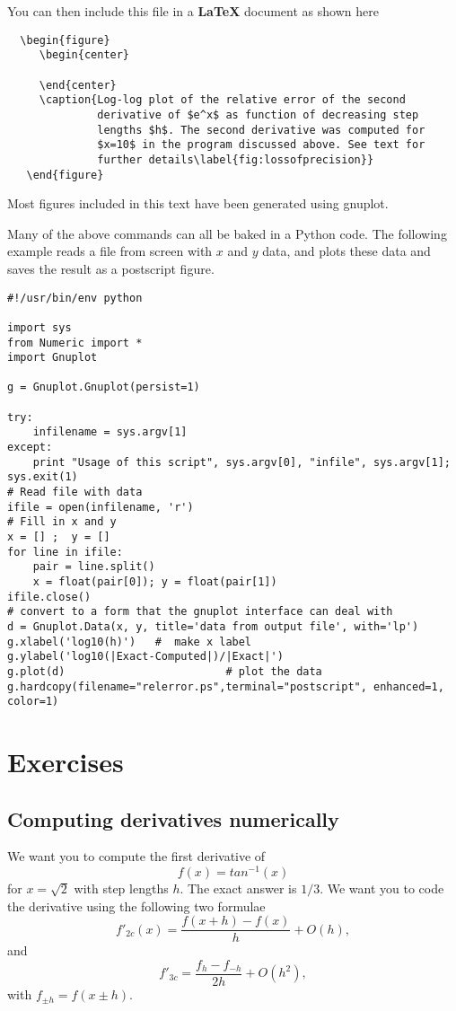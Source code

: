 You can then include this file in a {\bf \LaTeX} document
as shown here
\begin{verbatim}
  \begin{figure}
     \begin{center}
        
     \end{center}
     \caption{Log-log plot of the relative error of the second 
              derivative of $e^x$ as function of decreasing step 
              lengths $h$. The second derivative was computed for 
              $x=10$ in the program discussed above. See text for
              further details\label{fig:lossofprecision}}
   \end{figure}
\end{verbatim}
Most figures included in this text have been generated using gnuplot.
 

Many of the above commands can all be baked in a Python code.  
The following example reads a file from screen with $x$ and $y$ data, and plots these
data and saves the result as a postscript figure.
\lstset{language=python}  
\begin{lstlisting}
#!/usr/bin/env python

import sys
from Numeric import *
import Gnuplot

g = Gnuplot.Gnuplot(persist=1)

try:
    infilename = sys.argv[1]
except:
    print "Usage of this script", sys.argv[0], "infile", sys.argv[1]; sys.exit(1)
# Read file with data
ifile = open(infilename, 'r')
# Fill in x and y
x = [] ;  y = []
for line in ifile:
    pair = line.split()
    x = float(pair[0]); y = float(pair[1])
ifile.close()
# convert to a form that the gnuplot interface can deal with
d = Gnuplot.Data(x, y, title='data from output file', with='lp')
g.xlabel('log10(h)')   #  make x label
g.ylabel('log10(|Exact-Computed|)/|Exact|') 
g.plot(d)                         # plot the data
g.hardcopy(filename="relerror.ps",terminal="postscript", enhanced=1, color=1)
\end{lstlisting} 


\section{Exercises}
\subsection*{Computing derivatives numerically}
We want you to compute the first derivative of
\[
   f(x)=tan^{-1}(x) 
\]
for $x=\sqrt{2}$ with step lengths $h$. 
The exact answer is
$1/3$.
We want you to code the derivative using the following two
formulae 
\begin{equation}
    f'_{2c}(x)= \frac{f(x+h)-f(x)}{h}+O(h),
\label{eq:ex31a}
\end{equation}
and 
\begin{equation} 
   f'_{3c}=\frac{f_h-f_{-h}}{2h}+O(h^2),
\label{eq:ex31b}
\end{equation}
with $f_{\pm h}=f(x\pm h)$.



